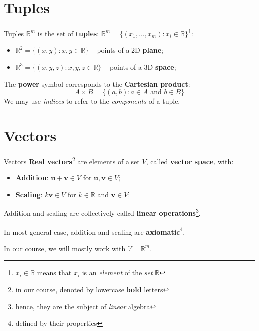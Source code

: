 \documentclass[10pt]{beamer}
\begin{document}
\section{Tuples}
\begin{frame}{Tuples}
    $\mathbb R^m$ is the set of \textbf{tuples}: $\mathbb R^m = \{(x_1,\dots,x_m) : x_i \in \mathbb R\}$\footnote{$x_i \in \mathbb R$ means that $x_i$ is an \textit{element} of the \textit{set} $\mathbb R$}:

    \begin{itemize}
        \item $\mathbb R^2 = \{(x, y) : x, y \in \mathbb R\}$ -- points of a 2D \textbf{plane};
        \item $\mathbb R^3 = \{(x, y, z): x, y, z \in \mathbb R\}$ -- points of a 3D \textbf{space};
    \end{itemize}

    The \textbf{power} symbol corresponds to the \textbf{Cartesian product}:
    $$
    A \times B = \{(a, b) : a \in A \text{ and } b \in B\}
    $$
    We may use \textit{indices} to refer to the \textit{components} of a tuple.
\end{frame}

\section{Vectors}
\begin{frame}{Vectors}
    \textbf{Real vectors}\footnote{in our course, denoted by lowercase \textbf{bold} letters} are elements of a set $V$, called \textbf{vector space}, with:

    \begin{itemize}
        \item \textbf{Addition}: $\mathbf{u} + \mathbf{v} \in V$ for $\mathbf{u}, \mathbf{v} \in V$;
        \item \textbf{Scaling}: $k \mathbf{v} \in V$ for $k \in \mathbb R$ and $\mathbf{v} \in V$;
    \end{itemize}

    Addition and scaling are collectively called \textbf{linear operations}\footnote{hence, they are the subject of \textit{linear} algebra}.

    In most general case, addition and scaling are \textbf{axiomatic}\footnote{defined by their properties}.

    In our course, we will mostly work with $V = \mathbb R^m$.
\end{frame}
\end{document}
